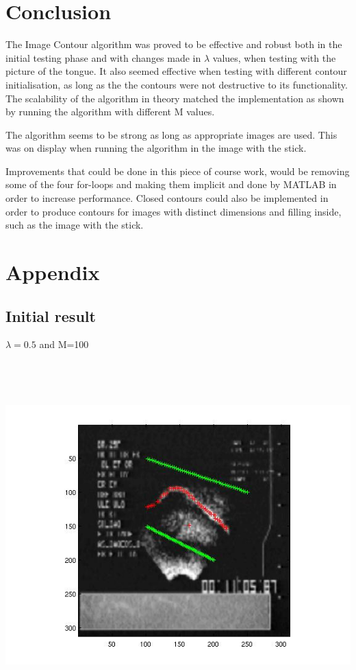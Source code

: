 \documentclass[12pt,a4paper,twocolumn]{article}
\begin{document}
\section{Conclusion}
The Image Contour algorithm was proved to be effective and robust both in the initial testing phase and with changes made in $\lambda$ values, when testing with the picture of the tongue. It also seemed effective when testing with different contour initialisation, as long as the the contours were not destructive to its functionality. The scalability of the algorithm in theory matched the implementation as shown by running the algorithm with different M values. 

The algorithm seems to be strong as long as appropriate images are used. This was on display when running the algorithm in the image with the stick.

Improvements that could be done in this piece of course work, would be removing some of the four for-loops and making them implicit and done by MATLAB in order to increase performance. Closed contours could also be implemented in order to produce contours for images with distinct dimensions and filling inside, such as the image with the stick.

\newpage
\mbox{}
\newpage
\mbox{}
\section{Appendix}
\subsection{Initial result}
$\lambda=0.5$ and M=100
\newline
\includegraphics[width=500pt,height=400pt,scale=1]{points_1_to_7.jpg}
\newpage
\mbox{}
\newpage
\end{document}
